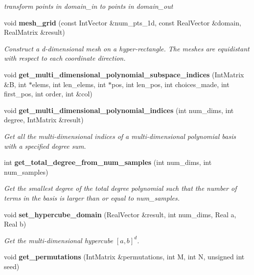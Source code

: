 \begin{DoxyCompactItemize}
\begin{DoxyCompactList}\small\item\em transform points in domain\+\_\+in to points in domain\+\_\+out \end{DoxyCompactList}\item 
void {\bfseries mesh\+\_\+grid} (const Int\+Vector \&num\+\_\+pts\+\_\+1d, const Real\+Vector \&domain, Real\+Matrix \&result)
\begin{DoxyCompactList}\small\item\em Construct a d-\/dimensional mesh on a hyper-\/rectangle. The meshes are equidistant with respect to each coordinate direction. \end{DoxyCompactList}\item 
void {\bfseries get\+\_\+multi\+\_\+dimensional\+\_\+polynomial\+\_\+subspace\+\_\+indices} (Int\+Matrix \&B, int $\ast$elems, int len\+\_\+elems, int $\ast$pos, int len\+\_\+pos, int choices\+\_\+made, int first\+\_\+pos, int order, int \&col)
\item 
void {\bfseries get\+\_\+multi\+\_\+dimensional\+\_\+polynomial\+\_\+indices} (int num\+\_\+dims, int degree, Int\+Matrix \&result)
\begin{DoxyCompactList}\small\item\em Get all the multi-\/dimensional indices of a multi-\/dimensional polynomial basis with a specified degree sum. \end{DoxyCompactList}\item 
int {\bfseries get\+\_\+total\+\_\+degree\+\_\+from\+\_\+num\+\_\+samples} (int num\+\_\+dims, int num\+\_\+samples)\label{MathTools_8cpp_a12ce4303082f09848959a4b6c97f0b62}

\begin{DoxyCompactList}\small\item\em Get the smallest degree of the total degree polynomial such that the number of terms in the basis is larger than or equal to num\+\_\+samples. \end{DoxyCompactList}\item 
void {\bfseries set\+\_\+hypercube\+\_\+domain} (Real\+Vector \&result, int num\+\_\+dims, Real a, Real b)
\begin{DoxyCompactList}\small\item\em Get the multi-\/dimensional hypercube $[a,b]^d$. \end{DoxyCompactList}\item 
void {\bfseries get\+\_\+permutations} (Int\+Matrix \&permutations, int M, int N, unsigned int seed)\label{MathTools_8cpp_a32764e08b89bb03e1a8d664bd173f2fb}


\end{DoxyCompactItemize}
